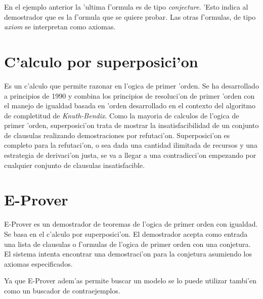 En el ejemplo anterior la 'ultima f'ormula es de tipo \textit{conjecture}. 'Esto indica al demostrador que es la f'ormula que se quiere probar. Las otras f'ormulas, de tipo \textit{axiom} se interpretan como axiomas.


\section{C'alculo por superposici'on}
Es un c'alculo que permite razonar en l'ogica de primer 'orden. Se ha desarrollado a principios de 1990 y combina los principios de resoluci'on de primer 'orden con el manejo de igualdad basada en 'orden desarrollado en el contexto del algoritmo de completitud de \textit{Knuth-Bendix}\cite{knuthbendix}. Como la mayoria de calculos de l'ogica de primer 'orden, superposici'on trata de mostrar la insatisfacibilidad de un conjunto de clausulas realizando demostraciones por refutaci'on. Superposici'on es completo para la refutaci'on, o sea dada una cantidad ilimitada de recursos y una estrategia de derivaci'on justa, se va a llegar a una contradicci'on empezando por cualquier conjunto de clausulas insatisfacible.


\section{E-Prover}
E-Prover es un demostrador de teoremas de l'ogica de primer orden con igualdad. Se basa en el c'alculo por superposici'on. El demostrador acepta como entrada una lista de clausulas o f'ormulas de l'ogica de primer orden con una conjetura. El sistema intenta encontrar una demostraci'on para la conjetura asumiendo los axiomas especificados.

Ya que E-Prover adem'as permite buscar un modelo se lo puede utilizar tambi'en como un buscador de contraejemplos.

